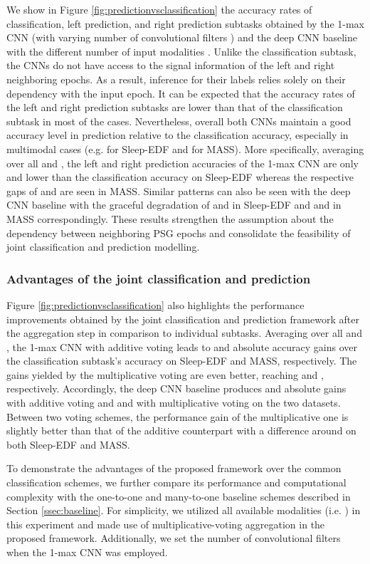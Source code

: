 \documentclass[10pt,twocolumn,twoside]{IEEEtran}
\begin{document}
We show in Figure \ref{fig:predictionvsclassification} the accuracy rates of classification, left prediction, and right prediction subtasks obtained by the 1-max CNN (with varying number of convolutional filters ) and the deep CNN baseline with the different number of input modalities . Unlike the classification subtask, the CNNs do not have access to the signal information of the left and right neighboring epochs. As a result, inference for their labels relies solely on their dependency with the input epoch. It can be expected that the accuracy rates of the left and right prediction subtasks are lower than that of the classification subtask in most of the cases. Nevertheless, overall both CNNs maintain a good accuracy level in prediction relative to the classification accuracy, especially in multimodal cases (e.g.  for Sleep-EDF and  for MASS).
More specifically, averaging over all  and , the left and right prediction accuracies of the 1-max CNN are only  and  lower than the classification accuracy on Sleep-EDF whereas the respective gaps of  and  are seen in MASS. Similar patterns can also be seen with the deep CNN baseline with the graceful degradation of  and  in Sleep-EDF and  and  in MASS correspondingly.
These results strengthen the assumption about the dependency between neighboring PSG epochs and consolidate the feasibility of joint classification and prediction modelling.


\subsubsection{Advantages of the joint classification and prediction}

Figure \ref{fig:predictionvsclassification} also highlights the performance improvements obtained by the joint classification and prediction framework after the aggregation step in comparison to individual subtasks. 
Averaging over all  and , the 1-max CNN with additive voting leads to  and  absolute accuracy gains over the classification subtask's accuracy on Sleep-EDF and MASS, respectively. The gains yielded by the multiplicative voting are even better, reaching  and , respectively. Accordingly, the deep CNN baseline produces  and  absolute gains with additive voting and  and  with multiplicative voting on the two datasets. Between two voting schemes, the performance gain of the multiplicative one is slightly better than that of the additive counterpart with a difference around  on both Sleep-EDF and MASS. 

To demonstrate the advantages of the proposed framework over the common classification schemes, we further compare its performance and computational complexity with the one-to-one and many-to-one baseline schemes described in Section \ref{ssec:baseline}. 
For simplicity, we utilized all available modalities (i.e. ) in this experiment and made use of multiplicative-voting aggregation in the proposed framework. Additionally, we set the number of convolutional filters  when the 1-max CNN was employed.
\end{document}
